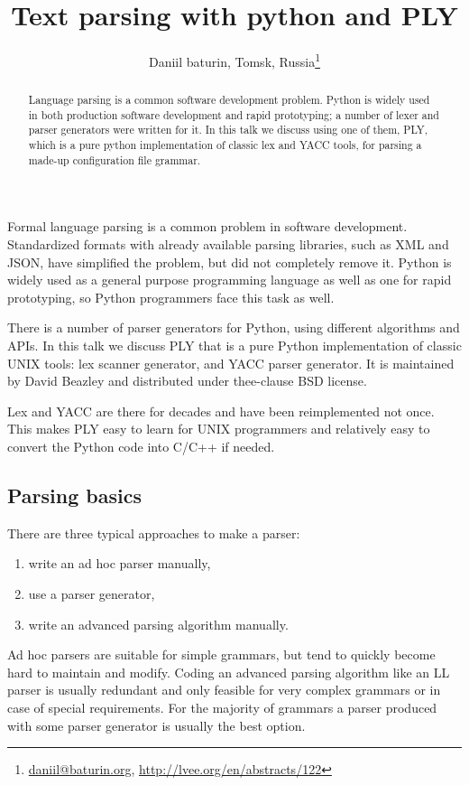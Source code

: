 \documentclass[10pt, a5paper]{article}
\begin{document}
\title{Text parsing with python and PLY}
\author{Daniil baturin, Tomsk, Russia\footnote{\url{daniil@baturin.org}, \url{http://lvee.org/en/abstracts/122}}}
\maketitle
\begin{abstract}
Language parsing is a common software development problem. Python is widely used in both production software development and rapid prototyping; a number of lexer and parser generators were written for it.
In this talk we discuss using one of them, PLY, which is a pure python implementation of classic lex and YACC tools, for parsing a made-up configuration file grammar.
\end{abstract}
Formal language parsing is a common problem in software development. Standardized formats with already available parsing libraries, such as XML and JSON, have simplified the problem, but did not completely remove it. Python is widely used as a general purpose programming language as well as one for rapid prototyping, so Python programmers face this task as well.

There is a number of parser generators for Python, using different algorithms and APIs. In this talk we discuss PLY that is a pure Python implementation of classic UNIX tools: lex scanner generator, and YACC parser generator. It is maintained by David Beazley and distributed under thee-clause BSD license.

Lex and YACC are there for decades and have been reimplemented not once. This makes PLY easy to learn for UNIX programmers and relatively easy to convert the Python code into C/C++ if needed.

\subsection*{Parsing basics}

There are three typical approaches to make a parser:

\begin{enumerate}
  \item write an ad hoc parser manually,
  \item use a parser generator,
  \item write an advanced parsing algorithm manually.
\end{enumerate}

Ad hoc parsers are suitable for simple grammars, but tend to quickly become hard to maintain and modify. Coding an advanced parsing algorithm like an LL parser is usually redundant and only feasible for very complex grammars or in case of special requirements. For the majority of grammars a parser produced with some parser generator is usually the best option.
\end{document}
